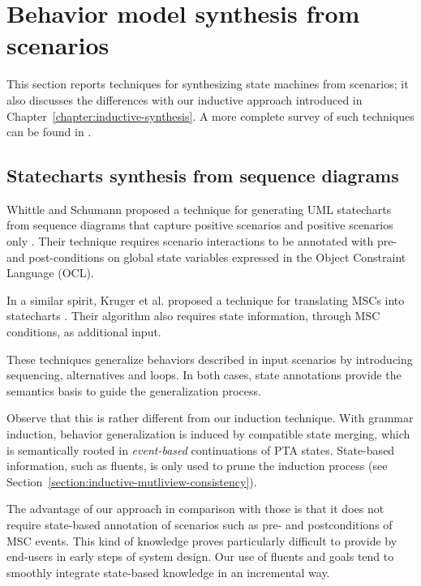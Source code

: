 \section{Behavior model synthesis from scenarios\label{section:related-from-scenarios}}

This section reports techniques for synthesizing state machines from scenarios; it also discusses the differences with our inductive approach introduced in Chapter~\ref{chapter:inductive-synthesis}. A more complete survey of such techniques can be found in \cite{Liang:2006}.


\subsection{Statecharts synthesis from sequence diagrams}

Whittle and Schumann proposed a technique for generating UML statecharts from sequence diagrams that capture positive scenarios and positive scenarios only \cite{Whittle:2000}. Their technique requires scenario interactions to be annotated with pre- and post-conditions on global state variables expressed in the Object Constraint Language (OCL). 

In a similar spirit, Kruger et al. proposed a technique for translating MSCs into statecharts \cite{Kruger:2000}. Their algorithm also requires state information, through MSC conditions, as additional input.

These techniques generalize behaviors described in input scenarios by introducing sequencing, alternatives and loops. In both cases, state annotations provide the semantics basis to guide the generalization process. 

Observe that this is rather different from our induction technique. With grammar induction, behavior generalization is induced by compatible state merging, which is semantically rooted in \emph{event-based} continuations of PTA states. State-based information, such as fluents, is only used to prune the induction process (see Section~\ref{section:inductive-mutliview-consistency}). 

The advantage of our approach in comparison with those is that it does not require state-based annotation of scenarios such as pre- and postconditions of MSC events. This kind of knowledge proves particularly difficult to provide by end-users in early steps of system design. Our use of fluents and goals tend to smoothly integrate state-based knowledge in an incremental way.

